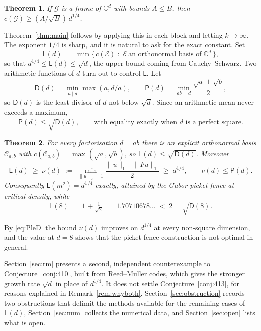 \documentclass[11pt,reqno]{amsart}
\theoremstyle{plain}
\newtheorem{theorem}{Theorem}[section]
\theoremstyle{definition}
\theoremstyle{remark}
\newcommand{\C}{\mathbb{C}}
\newcommand{\Lb}{\mathsf{L}}
\newcommand{\Dd}{\mathsf{D}}
\newcommand{\Pp}{\mathsf{P}}
\begin{document}
\begin{theorem}\label{thm:frame}
If $\mathcal{G}$ is a frame of $\C^d$ with bounds $A\le B$, then
$c(\mathcal{G})\ge (A/\sqrt B)\,d^{1/4}$.
\end{theorem}

Theorem~\ref{thm:main} follows by applying this in each block and
letting $k\to\infty$.  The exponent $1/4$ is sharp, and it is natural to
ask for the exact constant.  Set
\[
  \Lb(d)\;=\;\min\bigl\{\,c(\mathcal{E})\;:\;\mathcal{E}\ \text{an
  orthonormal basis of }\C^d\,\bigr\},
\]
so that $d^{1/4}\le\Lb(d)\le\sqrt d$, the upper bound coming from
Cauchy--Schwarz.  Two arithmetic functions of $d$ turn out to control
$\Lb$.  Let
\[
  \Dd(d)=\min_{a\mid d}\max(a,d/a),
  \qquad
  \Pp(d)=\min_{ab=d}\frac{\sqrt a+\sqrt b}{2},
\]
so $\Dd(d)$ is the least divisor of $d$ not below $\sqrt d$.  Since an
arithmetic mean never exceeds a maximum,
\begin{equation}\label{eq:PleD}
  \Pp(d)\le\sqrt{\Dd(d)},
  \qquad\text{with equality exactly when $d$ is a perfect square.}
\end{equation}

\begin{theorem}\label{thm:Lb}
For every factorisation $d=ab$ there is an explicit orthonormal basis
$\mathcal{C}_{a,b}$ with $c(\mathcal{C}_{a,b})=\max(\sqrt a,\sqrt b)$,
so $\Lb(d)\le\sqrt{\Dd(d)}$.  Moreover
\[
  \Lb(d)\;\ge\;\nu(d)\;:=\;\min_{\|u\|_2=1}
  \frac{\|u\|_1+\|Fu\|_1}{2}\;\ge\;d^{1/4},
  \qquad \nu(d)\le\Pp(d).
\]
Consequently $\Lb(m^2)=d^{1/4}$ exactly, attained by the Gabor picket
fence at critical density, while
\[
  \Lb(8)\;=\;1+\tfrac1{\sqrt2}\;=\;1.70710678\ldots\;<\;2=\sqrt{\Dd(8)} .
\]
\end{theorem}

By \eqref{eq:PleD} the bound $\nu(d)$ improves on $d^{1/4}$ at every
non-square dimension, and the value at $d=8$ shows that the
picket-fence construction is not optimal in general.

Section~\ref{sec:rm} presents a second, independent counterexample to
Conjecture~\ref{conj:410}, built from Reed--Muller codes, which gives
the stronger growth rate $\sqrt d$ in place of $d^{1/4}$.  It does not
settle Conjecture~\ref{conj:413}, for reasons explained in
Remark~\ref{rem:whyboth}.  Section~\ref{sec:obstruction} records two
obstructions that delimit the methods available for the remaining cases
of $\Lb(d)$, Section~\ref{sec:num} collects the numerical data, and
Section~\ref{sec:open} lists what is open.
\end{document}

